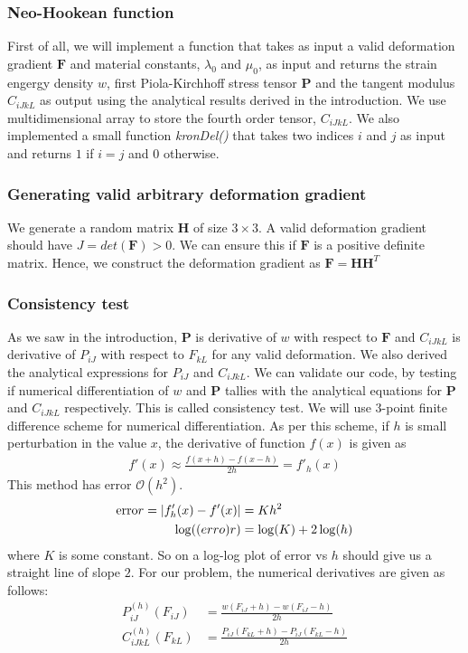 \message{ !name(p1_2.tex)}\documentclass[../main.tex]{subfiles}
\begin{document}
\subsubsection{Neo-Hookean function}
First of all, we will implement a function that takes as input a valid
deformation gradient $\mathbf{F}$ and material constants, $\lambda_0$
and $\mu_0$, as input and returns the strain engergy density $w$,
first Piola-Kirchhoff stress tensor $\mathbf{P}$ and the tangent
modulus $C_{iJkL}$ as output using the analytical results derived in
the introduction. We use multidimensional array to store the fourth
order tensor, $C_{iJkL}$. We also implemented a small function
\textit{kronDel()} that takes two indices $i$ and $j$ as input and
returns $1$ if $i=j$ and $0$ otherwise.
\subsubsection{Generating valid arbitrary deformation gradient}
We generate a random matrix $\mathbf{H}$ of size $3\times 3$. A valid
deformation gradient should have $J = det(\mathbf{F}) > 0$. We can
ensure this if $\mathbf{F}$ is a positive definite matrix. Hence, we
construct the deformation gradient as $\mathbf{F} = \mathbf{HH}^T$
\subsubsection{Consistency test}
\label{sec:consistency}
As we saw in the introduction, $\mathbf{P}$ is derivative of $w$ with
respect to $\mathbf{F}$ and $C_{iJkL}$ is derivative of $P_{iJ}$ with
respect to $F_{kL}$ for any valid deformation. We also derived the
analytical expressions for $P_{iJ}$ and $C_{iJkL}$. We can validate
our code, by testing if numerical differentiation of $w$ and
$\mathbf{P}$ tallies with the analytical equations for $\mathbf{P}$
and $C_{iJkL}$ respectively. This is called consistency test.  We will
use 3-point finite difference scheme for numerical differentiation. As
per this scheme, if $h$ is small perturbation in the value $x$, the
derivative of function $f(x)$ is given as
\begin{align*}
  f'(x) \approx \frac{f(x+h)-f(x-h)}{2h} = f'_h(x)
\end{align*}
This method has error $\mathcal{O}(h^2)$.
\begin{align*}
  \text{erro}r = |f'_h(x) - f'(x)| &= Kh^2\\
  \log(\text(erro)r) &= \log(K) + 2\log(h)\\
\end{align*}
where $K$ is some constant. So on a log-log plot of $\text{error}$ vs
$h$ should give us a straight line of slope $2$.  For our problem, the
numerical derivatives are given as follows:
\begin{align*}
  P^{(h)}_{iJ}(F_{iJ}) &= \frac{w(F_{iJ}+h) - w(F_{iJ}-h)}{2h}\\
  C^{(h)}_{iJkL}(F_{kL})&=\frac{P_{iJ}(F_{kL}+h) - P_{iJ}(F_{kL}-h)}{2h}\\
\end{align*}
\end{document}
